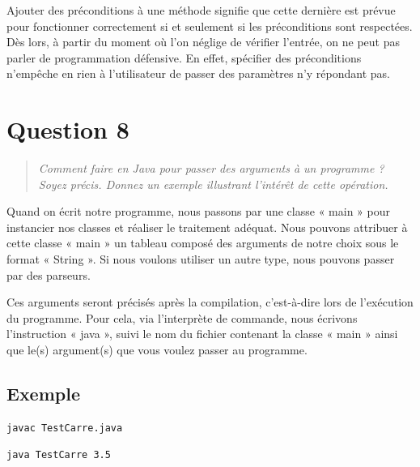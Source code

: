 \documentclass[11pt,a4paper]{article}
\begin{document}
Ajouter des préconditions à une méthode signifie que cette dernière est prévue pour fonctionner correctement si et seulement si les préconditions sont respectées. Dès lors, à partir du moment où l'on néglige de vérifier l'entrée, on ne peut pas parler de programmation défensive. En effet, spécifier des préconditions n'empêche en rien à l'utilisateur de passer des paramètres n'y répondant pas.

\section{Question 8}
\begin{quotation}
\textit{Comment faire en Java pour passer des arguments à un programme ? Soyez précis.
Donnez un exemple illustrant l’intérêt de cette opération.}
\end{quotation}
Quand on écrit notre programme, nous passons par une classe « main » pour instancier nos classes et réaliser le traitement adéquat. Nous pouvons attribuer à cette classe « main » un tableau composé des arguments de notre choix sous le format « String ». Si nous voulons utiliser un autre type, nous pouvons passer par des parseurs.

Ces arguments seront précisés après la compilation, c’est-à-dire lors de l’exécution du programme. Pour cela, via l’interprète de commande, nous écrivons l’instruction « java », suivi le nom du fichier contenant la classe « main » ainsi que le(s) argument(s) que vous voulez passer au programme.
\subsection*{Exemple}


\begin{lstlisting}[caption=Compilation]
javac TestCarre.java
\end{lstlisting}
\begin{lstlisting}[caption=Exécution (3.5 correspond à l’argument que l’on passe au programme)]
java TestCarre 3.5
\end{lstlisting}
\end{document}
